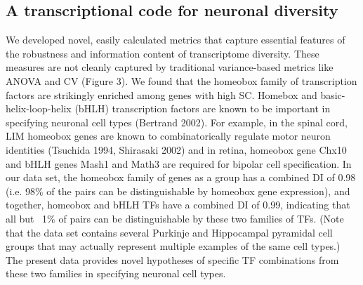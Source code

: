 \subsection{A transcriptional code for neuronal diversity}
We developed novel, easily calculated metrics that capture essential features of the robustness and information content of transcriptome diversity. These measures are not cleanly captured by traditional variance-based metrics like ANOVA and CV (Figure 3). We found that the homeobox family of transcription factors are strikingly enriched among genes with high SC. Homebox and basic-helix-loop-helix (bHLH) transcription factors are known to be important in specifying neuronal cell types (Bertrand 2002). For example, in the spinal cord, LIM homeobox genes are known to combinatorically regulate motor neuron identities (Tsuchida 1994, Shirasaki 2002) and in retina, homeobox gene Chx10 and bHLH genes Mash1 and Math3 are required for bipolar cell specification. In our data set, the homeobox family of genes as a group has a combined DI of 0.98 (i.e. 98\% of the pairs can be distinguishable by homeobox gene expression), and together, homeobox and bHLH TFs have a combined DI of 0.99, indicating that all but ~1\% of pairs can be distinguishable by these two families of TFs. (Note that the data set contains several Purkinje and Hippocampal pyramidal cell groups that may actually represent multiple examples of the same cell types.) The present data provides novel hypotheses of specific TF combinations from these two families in specifying neuronal cell types.

